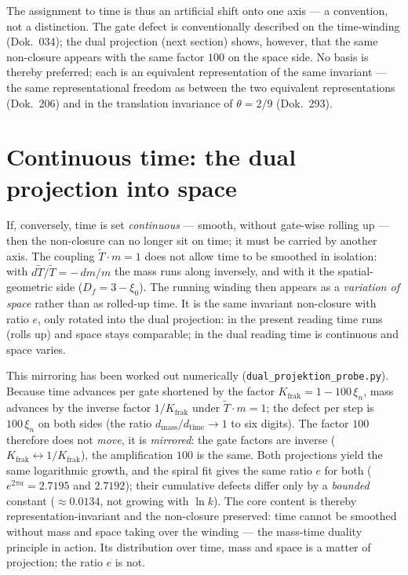 The assignment to time is thus an artificial shift onto one axis --- a convention, not a
distinction. The gate defect is conventionally described on the time-winding (Dok.~034); the dual
projection (next section) shows, however, that the same non-closure appears with the same factor
$100$ on the space side. No basis is thereby preferred; each is an equivalent representation of
the same invariant --- the same representational freedom as between the two equivalent
representations (Dok.~206) and in the translation invariance of $\theta=2/9$ (Dok.~293).

\section{Continuous time: the dual projection into space}
If, conversely, time is set \emph{continuous} --- smooth, without gate-wise rolling up --- then
the non-closure can no longer sit on time; it must be carried by another axis. The coupling
$\tilde T\cdot m=1$ does not allow time to be smoothed in isolation: with
$d\tilde T/\tilde T=-\,dm/m$ the mass runs along inversely, and with it the spatial-geometric side
($D_f=3-\xi_0$). The running winding then appears as a \emph{variation of space} rather than as
rolled-up time. It is the same invariant non-closure with ratio $e$, only rotated into the dual
projection: in the present reading time runs (rolls up) and space stays comparable; in the dual
reading time is continuous and space varies.

This mirroring has been worked out numerically (\texttt{dual\_projektion\_probe.py}). Because time
advances per gate shortened by the factor $K_{\text{frak}}=1-100\,\xi_n$, mass advances by the
inverse factor $1/K_{\text{frak}}$ under $\tilde T\cdot m=1$; the defect per step is $100\,\xi_n$
on both sides (the ratio $d_{\text{mass}}/d_{\text{time}}\to1$ to six digits). The factor $100$
therefore does not \emph{move}, it is \emph{mirrored}: the gate factors are inverse
($K_{\text{frak}}\leftrightarrow1/K_{\text{frak}}$), the amplification $100$ is the same. Both
projections yield the same logarithmic growth, and the spiral fit gives the same ratio $e$ for
both ($e^{2\pi a}=2{.}7195$ and $2{.}7192$); their cumulative defects differ only by a
\emph{bounded} constant ($\approx0{.}0134$, not growing with $\ln k$). The core content is thereby
representation-invariant and the non-closure preserved: time cannot be smoothed without mass and
space taking over the winding --- the mass-time duality principle in action. Its distribution over
time, mass and space is a matter of projection; the ratio $e$ is not.

